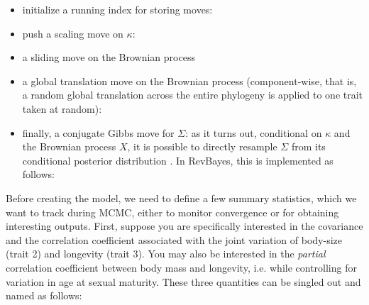 \begin{itemize}
\item
initialize a running index for storing moves:
\\
\item
push a scaling move on $\kappa$:
\\
\item
a sliding move on the Brownian process
\\
\item
a global translation move on the Brownian process (component-wise, that is, a random global translation across the entire phylogeny is applied to one trait taken at random):
\\
\item
finally, a conjugate Gibbs move for $\Sigma$: as it turns out, conditional on $\kappa$ and the Brownian process $X$, it is possible to directly resample $\Sigma$ from its conditional posterior distribution \citep{Lartillot:2011p55}. In RevBayes, this is implemented as follows:
\\
\end{itemize}
Before creating the model, we need to define a few summary statistics, which we want to track during MCMC, either to monitor convergence or for obtaining interesting outputs.
First, suppose you are specifically interested in the covariance and the correlation coefficient associated with the joint variation of body-size (trait 2) and longevity (trait 3). You may also be interested in the \emph{partial} correlation coefficient between body mass and longevity, i.e. while controlling for variation in age at sexual maturity. These three quantities can be singled out and named as follows:
